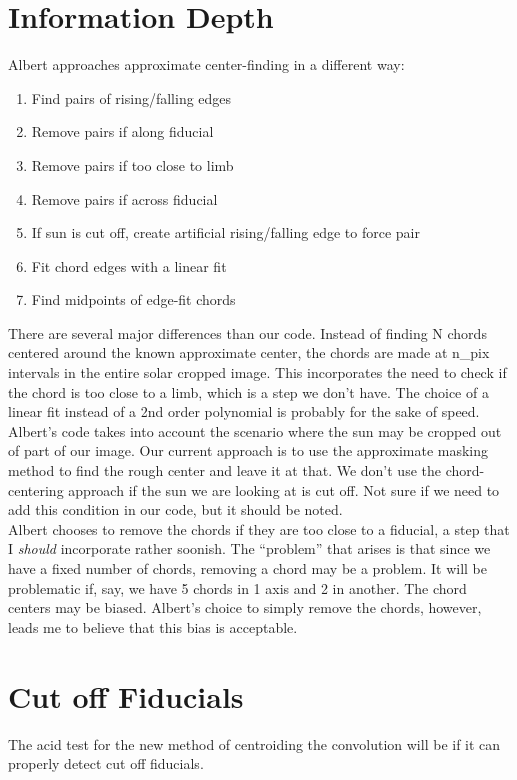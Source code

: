 \documentclass[10pt]{scrartcl}
\begin{document}
\section{Information Depth} %
\label{sec:information_depth}
Albert approaches approximate center-finding in a different way:

\begin{enumerate}
    \item Find pairs of rising/falling edges 
    \item Remove pairs if along fiducial
    \item Remove pairs if too close to limb
    \item Remove pairs if across fiducial
    \item If sun is cut off, create artificial rising/falling edge to force pair
    \item Fit chord edges with a linear fit
    \item Find midpoints of edge-fit chords
\end{enumerate}

There are several major differences than our code. Instead of finding N chords centered around the known approximate center, the chords are made at n\_pix intervals in the entire solar cropped image. This incorporates the need to check if the chord is too close to a limb, which is a step we don't have. The choice of a linear fit instead of a 2nd order polynomial is probably for the sake of speed. \\

Albert's code takes into account the scenario where the sun may be cropped out of part of our image. Our current approach is to use the approximate masking method to find the rough center and leave it at that. We don't use the chord-centering approach if the sun we are looking at is cut off. Not sure if we need to add this condition in our code, but it should be noted.\\

Albert chooses to remove the chords if they are too close to a fiducial, a step that I \emph{should} incorporate rather soonish. The ``problem'' that arises is that since we have a fixed number of chords, removing a chord may be a problem. It will be problematic if, say, we have 5 chords in 1 axis and 2 in another. The chord centers may be biased. Albert's choice to simply remove the chords, however, leads me to believe that this bias is acceptable. 

\section{Cut off Fiducials} %
\label{sec:cut_off_fiducials}
The acid test for the new method of centroiding the convolution will be if it can properly detect cut off fiducials. \\
\end{document}
